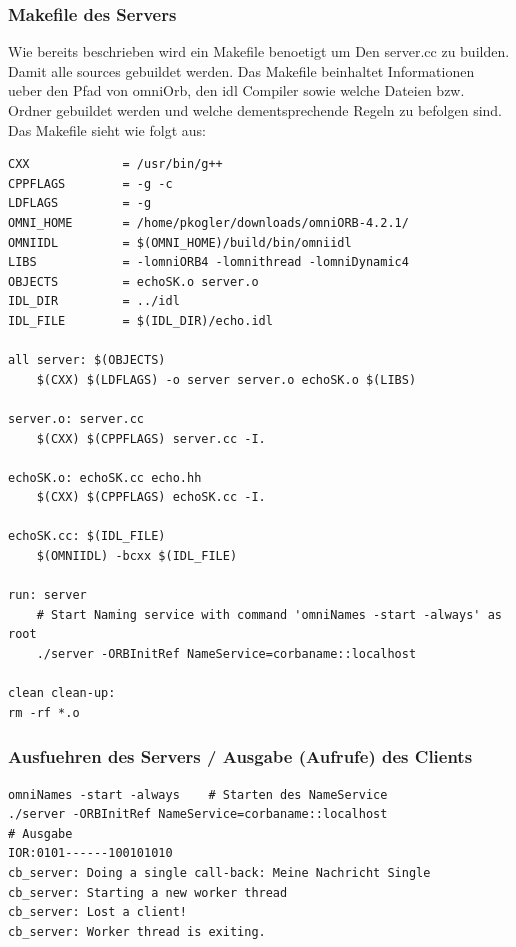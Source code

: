 \subsubsection{Makefile des Servers}
Wie bereits beschrieben wird ein Makefile benoetigt um Den server.cc zu builden. Damit alle sources gebuildet werden. Das Makefile beinhaltet Informationen ueber den Pfad von omniOrb, den idl Compiler sowie welche Dateien bzw. Ordner gebuildet werden und welche dementsprechende Regeln zu befolgen sind.
Das Makefile sieht wie folgt aus:
\begin{lstlisting}[style=C++, caption=echo.idl call back]	
CXX             = /usr/bin/g++
CPPFLAGS        = -g -c
LDFLAGS         = -g
OMNI_HOME       = /home/pkogler/downloads/omniORB-4.2.1/
OMNIIDL         = $(OMNI_HOME)/build/bin/omniidl
LIBS            = -lomniORB4 -lomnithread -lomniDynamic4
OBJECTS         = echoSK.o server.o
IDL_DIR         = ../idl
IDL_FILE        = $(IDL_DIR)/echo.idl

all server: $(OBJECTS)
	$(CXX) $(LDFLAGS) -o server server.o echoSK.o $(LIBS)

server.o: server.cc
	$(CXX) $(CPPFLAGS) server.cc -I.

echoSK.o: echoSK.cc echo.hh
	$(CXX) $(CPPFLAGS) echoSK.cc -I.

echoSK.cc: $(IDL_FILE)
	$(OMNIIDL) -bcxx $(IDL_FILE)

run: server
	# Start Naming service with command 'omniNames -start -always' as root
	./server -ORBInitRef NameService=corbaname::localhost

clean clean-up:
rm -rf *.o

\end{lstlisting}


\subsubsection{Ausfuehren des Servers / Ausgabe (Aufrufe) des Clients}
\begin{lstlisting}[style=BashInputStyle, caption=Ausfuehern des Servers]
omniNames -start -always	# Starten des NameService
./server -ORBInitRef NameService=corbaname::localhost
# Ausgabe
IOR:0101------100101010
cb_server: Doing a single call-back: Meine Nachricht Single
cb_server: Starting a new worker thread
cb_server: Lost a client!
cb_server: Worker thread is exiting.
\end{lstlisting}

\clearpage

